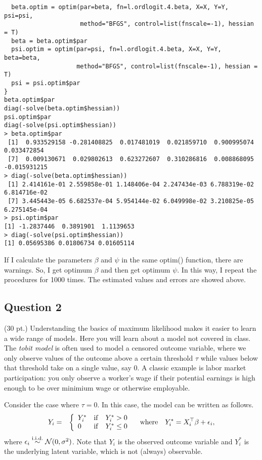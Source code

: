 \documentclass[11pt,english]{article}
\newcommand{\iid}{\stackrel{\rm i.i.d.}{\sim}}
\begin{document}
\begin{itemize}
\begin{verbatim}
  beta.optim = optim(par=beta, fn=l.ordlogit.4.beta, X=X, Y=Y, psi=psi,
                     method="BFGS", control=list(fnscale=-1), hessian = T)
  beta = beta.optim$par
  psi.optim = optim(par=psi, fn=l.ordlogit.4.beta, X=X, Y=Y, beta=beta,
                    method="BFGS", control=list(fnscale=-1), hessian = T)
  psi = psi.optim$par
}
beta.optim$par
diag(-solve(beta.optim$hessian))
psi.optim$par
diag(-solve(psi.optim$hessian))
> beta.optim$par
 [1]  0.933529158 -0.281408825  0.017481019  0.021859710  0.900995074  0.033472854
 [7]  0.009130671  0.029802613  0.623272607  0.310286816  0.008868095 -0.015931215
> diag(-solve(beta.optim$hessian))
 [1] 2.414161e-01 2.559858e-01 1.148406e-04 2.247434e-03 6.788319e-02 6.814716e-02
 [7] 3.445443e-05 6.682537e-04 5.954144e-02 6.049998e-02 3.210825e-05 6.275145e-04
> psi.optim$par
[1] -1.2837446  0.3891901  1.1139653
> diag(-solve(psi.optim$hessian))
[1] 0.05695386 0.01806734 0.01605114
\end{verbatim}
If I calculate the parameters $\beta$ and $\psi$ in the same optim() function, there are warnings.  So, I get optimum $\beta$ and then get optimum $\psi$.  In this way, I repeat the procedures for 1000 times.  The estimated values and errors are showed above.


\end{itemize}

\subsection*{Question 2}
(30 pt.) Understanding the basics of maximum likelihood makes it easier to learn a wide range of models. Here you will learn about a model not covered in class. The {\it tobit model} is often used to model a censored
outcome variable, where we only observe values of the outcome above a certain threshold $\tau$ while values below that threshold take on a single value, say 0. A classic example is labor market participation:  you only observe a worker's wage if their potential earnings is high enough to be over minimium wage or otherwise employable.

Consider the case where $\tau=0$. In this case, the model can be written as follows.
  \begin{eqnarray*}
    Y_i & = & \left\{ \begin{array}{ll}
                    Y_i^\ast & {\rm if} \quad Y_i^\ast > 0 \\
                    0 & {\rm if} \quad Y_i^\ast \le 0 \end{array} \right.
                    \quad {\rm where} \quad Y_i^\ast = X_i^\top \beta + \epsilon_i,
  \end{eqnarray*}
  where $\epsilon_i \iid \mathcal{N}(0, \sigma^2)$.  Note that $Y_i$
  is the observed outcome variable and $Y_i^\ast$ is the underlying
  latent variable, which is not (always) observable.
\end{document}
